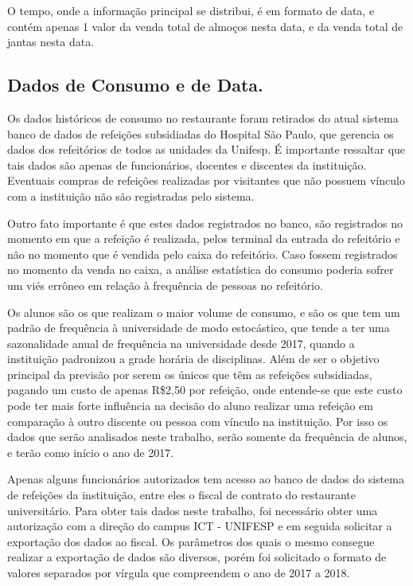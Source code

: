 \documentclass[	12pt, Times, openright, twoside, a4paper, english, brazil]{abntex2}
\begin{document}
	O tempo, onde a informação principal se distribui, é em formato de data, e contém apenas 1 valor da venda total de almoços nesta data, e da venda total de jantas nesta data.
	
	\subsection{Dados de Consumo e de Data.}
	Os dados históricos de consumo no restaurante foram retirados do atual sistema banco de dados de refeições subsidiadas do Hospital São Paulo, que gerencia os dados dos refeitórios de todos as unidades da Unifesp. É importante ressaltar que tais dados são apenas de funcionários, docentes e discentes da instituição. Eventuais compras de refeições realizadas por visitantes que não possuem vínculo com a instituição não são registradas pelo sistema. 
	
	Outro fato importante é que estes dados registrados no banco, são registrados no momento em que a refeição é realizada, pelos terminal da entrada do refeitório e não no momento que é vendida pelo caixa do refeitório. Caso fossem registrados no momento da venda no caixa, a análise estatística do consumo poderia sofrer um viés errôneo em relação à frequência de pessoas no refeitório. 
	
	Os alunos são os que realizam o maior volume de consumo, e são os que tem um padrão de frequência à universidade de modo estocástico, que tende a ter uma sazonalidade anual de frequência na universidade desde 2017, quando a instituição padronizou a grade horária de disciplinas.  Além de ser o objetivo principal da previsão por serem os únicos que têm as refeições subsidiadas, pagando um custo de apenas R\$2,50 por refeição, onde entende-se que este custo pode ter mais forte influência na decisão do aluno realizar uma refeição em comparação à outro discente ou pessoa com vínculo na instituição. Por isso os dados que serão analisados neste trabalho, serão somente da frequência de alunos, e terão como início o ano de 2017. 
	
	Apenas alguns funcionários autorizados tem acesso ao banco de dados do sistema de refeições da instituição, entre eles o fiscal de contrato do restaurante universitário. Para obter tais dados neste trabalho, foi necessário obter uma autorização com a direção do campus ICT - UNIFESP e em seguida solicitar a exportação dos dados ao fiscal. Os parâmetros dos quais o mesmo consegue realizar a exportação de dados são diversos, porém foi solicitado o formato de valores separados por vírgula que compreendem o ano de 2017 a 2018.
	
\end{document}
